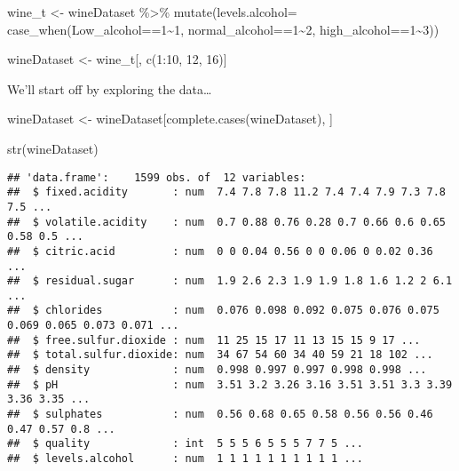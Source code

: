 \documentclass[
]{article}
\newenvironment{Shaded}{\begin{snugshade}}{\end{snugshade}}
\newcommand{\AttributeTok}[1]{\textcolor[rgb]{0.77,0.63,0.00}{#1}}
\newcommand{\DecValTok}[1]{\textcolor[rgb]{0.00,0.00,0.81}{#1}}
\newcommand{\FunctionTok}[1]{\textcolor[rgb]{0.00,0.00,0.00}{#1}}
\newcommand{\NormalTok}[1]{#1}
\newcommand{\OtherTok}[1]{\textcolor[rgb]{0.56,0.35,0.01}{#1}}
\newcommand{\SpecialCharTok}[1]{\textcolor[rgb]{0.00,0.00,0.00}{#1}}
\begin{document}
\begin{Shaded}
\begin{Highlighting}[]
\NormalTok{wine\_t }\OtherTok{\textless{}{-}}\NormalTok{ wineDataset }\SpecialCharTok{\%\textgreater{}\%} \FunctionTok{mutate}\NormalTok{(}\AttributeTok{levels.alcohol=}
                            \FunctionTok{case\_when}\NormalTok{(Low\_alcohol}\SpecialCharTok{==}\DecValTok{1}\SpecialCharTok{\textasciitilde{}}\DecValTok{1}\NormalTok{, normal\_alcohol}\SpecialCharTok{==}\DecValTok{1}\SpecialCharTok{\textasciitilde{}}\DecValTok{2}\NormalTok{, high\_alcohol}\SpecialCharTok{==}\DecValTok{1}\SpecialCharTok{\textasciitilde{}}\DecValTok{3}\NormalTok{))}

\NormalTok{wineDataset }\OtherTok{\textless{}{-}}\NormalTok{ wine\_t[, }\FunctionTok{c}\NormalTok{(}\DecValTok{1}\SpecialCharTok{:}\DecValTok{10}\NormalTok{, }\DecValTok{12}\NormalTok{, }\DecValTok{16}\NormalTok{)]}
\end{Highlighting}
\end{Shaded}

We'll start off by exploring the data\ldots{}

\begin{Shaded}
\begin{Highlighting}[]
\NormalTok{wineDataset }\OtherTok{\textless{}{-}}\NormalTok{ wineDataset[}\FunctionTok{complete.cases}\NormalTok{(wineDataset), ]}

\FunctionTok{str}\NormalTok{(wineDataset)}
\end{Highlighting}
\end{Shaded}

\begin{verbatim}
## 'data.frame':    1599 obs. of  12 variables:
##  $ fixed.acidity       : num  7.4 7.8 7.8 11.2 7.4 7.4 7.9 7.3 7.8 7.5 ...
##  $ volatile.acidity    : num  0.7 0.88 0.76 0.28 0.7 0.66 0.6 0.65 0.58 0.5 ...
##  $ citric.acid         : num  0 0 0.04 0.56 0 0 0.06 0 0.02 0.36 ...
##  $ residual.sugar      : num  1.9 2.6 2.3 1.9 1.9 1.8 1.6 1.2 2 6.1 ...
##  $ chlorides           : num  0.076 0.098 0.092 0.075 0.076 0.075 0.069 0.065 0.073 0.071 ...
##  $ free.sulfur.dioxide : num  11 25 15 17 11 13 15 15 9 17 ...
##  $ total.sulfur.dioxide: num  34 67 54 60 34 40 59 21 18 102 ...
##  $ density             : num  0.998 0.997 0.997 0.998 0.998 ...
##  $ pH                  : num  3.51 3.2 3.26 3.16 3.51 3.51 3.3 3.39 3.36 3.35 ...
##  $ sulphates           : num  0.56 0.68 0.65 0.58 0.56 0.56 0.46 0.47 0.57 0.8 ...
##  $ quality             : int  5 5 5 6 5 5 5 7 7 5 ...
##  $ levels.alcohol      : num  1 1 1 1 1 1 1 1 1 1 ...
\end{verbatim}
\end{document}
